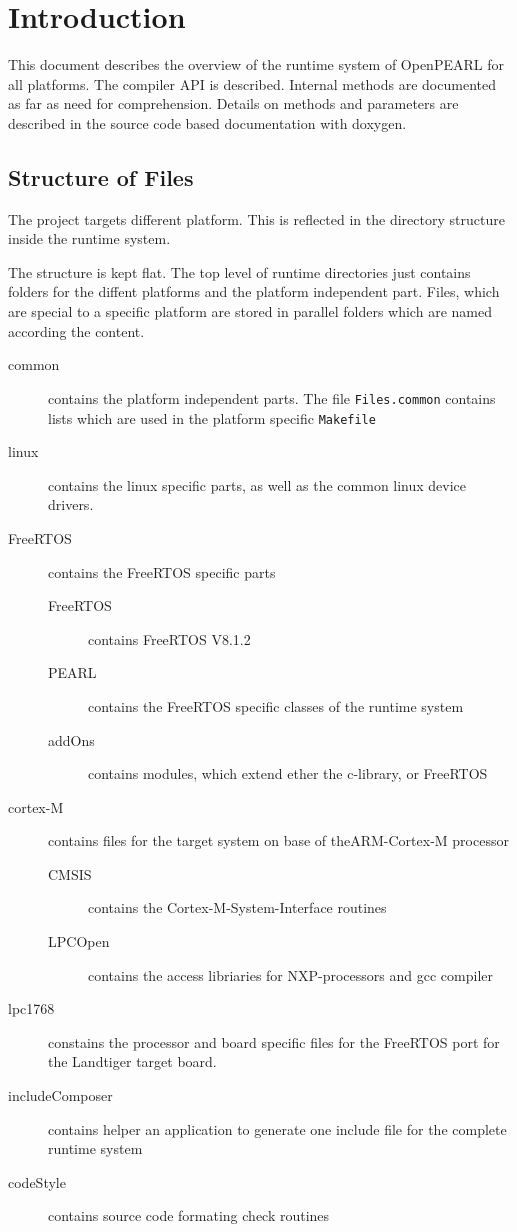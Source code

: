 	\chapter{Introduction}

	This document describes the overview of the runtime system
	of OpenPEARL for all platforms.
	The compiler API is described.
	Internal methods are documented as far as need for comprehension.
	Details on methods and parameters are 
	described in the source code based documentation with doxygen.

	\section{Structure of Files}
	The project targets different platform. 
	This is reflected in the directory structure inside the runtime system.

	The structure is kept flat. The top level of runtime directories
	just contains folders for the diffent platforms and the platform
	independent part. Files, which are special to a specific platform
	are stored in parallel folders which are named according the content.
	\begin{description}
	\item[common] contains the platform independent parts.
	   The file \verb|Files.common| contains lists which are used in the
	  platform specific  \verb|Makefile|
	\item[linux] contains the linux specific parts, as well as the common
	   linux device drivers. 
	\item[FreeRTOS] contains the FreeRTOS specific parts
	  \begin{description}
	  \item[FreeRTOS] contains FreeRTOS V8.1.2
	  \item [PEARL] contains the FreeRTOS specific classes of the runtime system
	  \item[addOns] contains modules, which extend ether the c-library, or
			FreeRTOS
	  \end{description}
	\item[cortex-M] contains files for the target system on base of theARM-Cortex-M
	   processor
	   \begin{description}
	   \item[CMSIS] contains the Cortex-M-System-Interface routines
	   \item[LPCOpen] contains the access libriaries for NXP-processors and
		      gcc compiler
	   \end{description}
	\item[lpc1768] constains the processor and board specific
	   files for the FreeRTOS port for the Landtiger target board.
	\item[includeComposer] contains helper an application to generate 
	   one include file for the complete runtime system
	\item[codeStyle] contains source code formating check routines
	\end{description}

